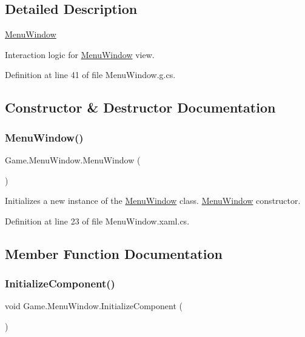 \subsection{Detailed Description}
\mbox{\hyperlink{class_game_1_1_menu_window}{Menu\+Window}} 

Interaction logic for \mbox{\hyperlink{class_game_1_1_menu_window}{Menu\+Window}} view.

Definition at line 41 of file Menu\+Window.\+g.\+cs.



\subsection{Constructor \& Destructor Documentation}
\mbox{\label{class_game_1_1_menu_window_aea0aa3ab11dc0d9baf4fc47c6088c13a}} 
\subsubsection{\texorpdfstring{MenuWindow()}{MenuWindow()}}
{\footnotesize\ttfamily Game.\+Menu\+Window.\+Menu\+Window (\begin{DoxyParamCaption}{ }\end{DoxyParamCaption})}



Initializes a new instance of the \mbox{\hyperlink{class_game_1_1_menu_window}{Menu\+Window}} class. \mbox{\hyperlink{class_game_1_1_menu_window}{Menu\+Window}} constructor. 



Definition at line 23 of file Menu\+Window.\+xaml.\+cs.



\subsection{Member Function Documentation}
\mbox{\label{class_game_1_1_menu_window_a22610c5f8a989abc6d3518b498acf3b4}} 
\subsubsection{\texorpdfstring{InitializeComponent()}{InitializeComponent()}\hspace{0.1cm}{\footnotesize\ttfamily [1/2]}}
{\footnotesize\ttfamily void Game.\+Menu\+Window.\+Initialize\+Component (\begin{DoxyParamCaption}{ }\end{DoxyParamCaption})}



